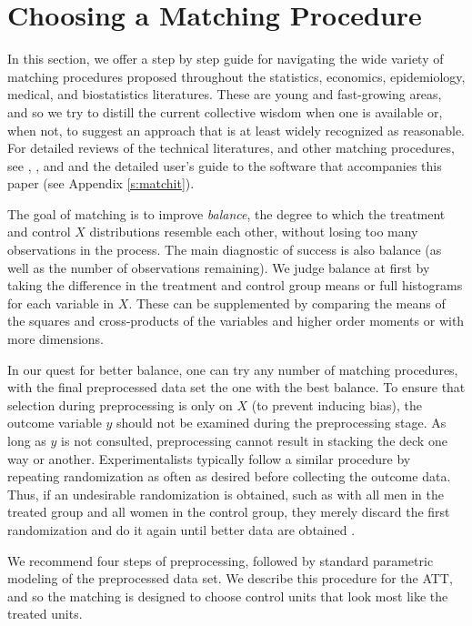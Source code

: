 \documentclass[11pt,titlepage]{article}
\begin{document}
\section{Choosing a Matching Procedure}\label{s:choose}

In this section, we offer a step by step guide for navigating the wide
variety of matching procedures proposed throughout the statistics,
economics, epidemiology, medical, and biostatistics literatures.
These are young and fast-growing areas, and so we try to distill the
current collective wisdom when one is available or, when not, to
suggest an approach that is at least widely recognized as reasonable.
For detailed reviews of the technical literatures, and other matching
procedures, see \citet{Imbens04}, \citet{Rosenbaum02}, and
\citet{Stuart04} and the detailed user's guide to the software that
accompanies this paper (see Appendix \ref{s:matchit}).

The goal of matching is to improve \emph{balance}, the degree to which
the treatment and control $X$ distributions resemble each other,
without losing too many observations in the process.  The main
diagnostic of success is also balance (as well as the number of
observations remaining).  We judge balance at first by taking the
difference in the treatment and control group means or full histograms
for each variable in $X$.  These can be supplemented by comparing the
means of the squares and cross-products of the variables and higher
order moments or with more dimensions.

In our quest for better balance, one can try any number of matching
procedures, with the final preprocessed data set the one with the best
balance.  To ensure that selection during preprocessing is only on $X$
(to prevent inducing bias), the outcome variable $y$ should not be
examined during the preprocessing stage.  As long as $y$ is not
consulted, preprocessing cannot result in stacking the deck one way or
another.  Experimentalists typically follow a similar procedure by
repeating randomization as often as desired before collecting the
outcome data.  Thus, if an undesirable randomization is obtained, such
as with all men in the treated group and all women in the control
group, they merely discard the first randomization and do it again
until better data are obtained \citep[see][]{Rubin01}.

We recommend four steps of preprocessing, followed by standard
parametric modeling of the preprocessed data set.  We describe this
procedure for the ATT, and so the matching is designed to choose
control units that look most like the treated units.
\end{document}
